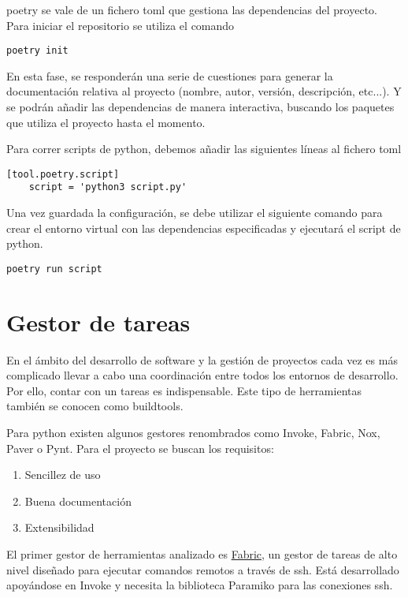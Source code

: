\gls{poetry} se vale de un fichero \gls{toml} que gestiona las \glspl{dependencia} del proyecto. Para iniciar el \gls{repositorio} se utiliza el comando
\begin{lstlisting}[style=consola]
	poetry init
\end{lstlisting}

En esta fase, se responderán una serie de cuestiones para generar la documentación relativa al proyecto (nombre, autor, versión, descripción, etc...). Y se podrán añadir las \glspl{dependencia} de manera interactiva, buscando los paquetes que utiliza el proyecto hasta el momento.

Para correr \glspl{script} de \gls{python}, debemos añadir las siguientes líneas al fichero \gls{toml}
\begin{lstlisting}[style=consola]
	[tool.poetry.script]
	script = 'python3 script.py'
\end{lstlisting}

Una vez guardada la configuración, se debe utilizar el siguiente comando para crear el entorno virtual con las \glspl{dependencia} especificadas y ejecutará el \gls{script} de \gls{python}. 
\begin{lstlisting}[style=consola]
	poetry run script
\end{lstlisting}

\section{Gestor de tareas}
En el ámbito del desarrollo de software y la gestión de proyectos cada vez es más complicado llevar a cabo una coordinación entre todos los entornos de desarrollo. Por ello, contar con un \gls{tareas} es indispensable. Este tipo de herramientas también se conocen como \gls{buildtools}. 

Para \gls{python} existen algunos gestores renombrados como Invoke, Fabric, Nox, Paver o Pynt. Para el proyecto se buscan los requisitos: 
\begin{enumerate}
	\item Sencillez de uso
	\item Buena documentación
	\item Extensibilidad
\end{enumerate}

El primer gestor de herramientas analizado es \href{https://www.fabfile.org/index.html}{Fabric}, un gestor de tareas de alto nivel diseñado para ejecutar comandos remotos a través de \gls{ssh}. Está desarrollado apoyándose en Invoke y necesita la biblioteca Paramiko para las conexiones \gls{ssh}.


